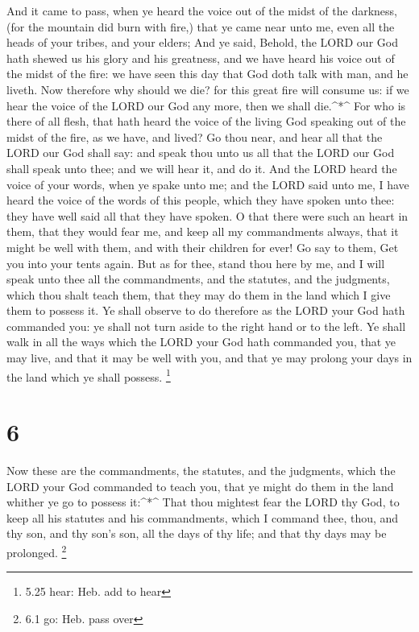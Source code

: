  And it came to pass, when ye heard the voice out of the
midst of the darkness, (for the mountain did burn with fire,) that ye
came near unto me, even all the heads of your tribes, and your elders;
 And ye said, Behold, the LORD our God hath shewed us his
glory and his greatness, and we have heard his voice out of the midst of
the fire: we have seen this day that God doth talk with man, and he
liveth.  Now therefore why should we die? for this great
fire will consume us: if we hear the voice of the LORD our God any more,
then we shall die.\^{}*\^{}  For who is there of all flesh,
that hath heard the voice of the living God speaking out of the midst of
the fire, as we have, and lived?  Go thou near, and hear
all that the LORD our God shall say: and speak thou unto us all that the
LORD our God shall speak unto thee; and we will hear it, and do it.
 And the LORD heard the voice of your words, when ye spake
unto me; and the LORD said unto me, I have heard the voice of the words
of this people, which they have spoken unto thee: they have well said
all that they have spoken.  O that there were such an heart
in them, that they would fear me, and keep all my commandments always,
that it might be well with them, and with their children for ever!
 Go say to them, Get you into your tents again.
 But as for thee, stand thou here by me, and I will speak
unto thee all the commandments, and the statutes, and the judgments,
which thou shalt teach them, that they may do them in the land which I
give them to possess it.  Ye shall observe to do therefore
as the LORD your God hath commanded you: ye shall not turn aside to the
right hand or to the left.  Ye shall walk in all the ways
which the LORD your God hath commanded you, that ye may live, and that
it may be well with you, and that ye may prolong your days in the land
which ye shall possess. \footnote{5.25 hear: Heb. add to hear}

\hypertarget{section-5}{%
\section{6}\label{section-5}}

 Now these are the commandments, the statutes, and the
judgments, which the LORD your God commanded to teach you, that ye might
do them in the land whither ye go to possess it:\^{}*\^{} 
That thou mightest fear the LORD thy God, to keep all his statutes and
his commandments, which I command thee, thou, and thy son, and thy son's
son, all the days of thy life; and that thy days may be prolonged.
\footnote{6.1 go: Heb. pass over}

